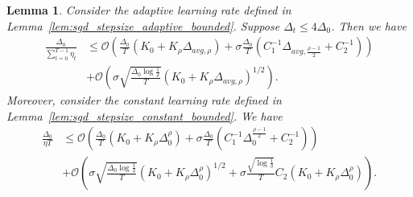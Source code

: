 \documentclass{article}
\newtheorem{lemma}{Lemma}
\newcommand{\Kr}{K_{\rho}}
\newcommand{\paren}[1]{\left( #1 \right)}
\begin{document}
\begin{lemma}\label{lem:sgd_stepsize_complexity_bounded}
    Consider the adaptive learning rate defined in Lemma~\ref{lem:sgd_stepsize_adaptive_bounded}. Suppose $\Delta_t\leq4\Delta_0$.
    Then  we have 
    \begin{align*}
       \frac{\Delta_0}{\sum_{t=0}^{T-1}\eta_t}&\leq \mathcal{O}\left(\frac{\Delta_0}{T}\paren{K_0+\Kr\Delta_{avg,\rho}}+\sigma\frac{\Delta_0}{T}\paren{C_1^{-1}\Delta_{avg,\frac{\rho-1}{2}}+C_2^{-1}}\right)\\
        &+ \mathcal{O}\paren{\sigma\sqrt{\frac{\Delta_0\log\frac{1}{\delta}}{T}}\paren{K_0+\Kr\Delta_{avg,\rho}}^{1/2}}.
    \end{align*}
    Moreover, consider the constant learning rate defined in Lemma~\ref{lem:sgd_stepsize_constant_bounded}. We have 
    \begin{align*}
        \frac{\Delta_0}{\eta T}&\leq \mathcal{O}\left(\frac{\Delta_0}{T}\paren{K_0+\Kr\Delta_{0}^\rho}+\sigma\frac{\Delta_0}{T}\paren{C_1^{-1}\Delta_{0}^{\frac{\rho-1}{2}}+C_2^{-1}}\right)\\
        &+ \mathcal{O}\paren{\sigma\sqrt{\frac{\Delta_0\log\frac{1}{\delta}}{T}}\paren{K_0+\Kr\Delta_{0}^{\rho}}^{1/2}+\sigma\frac{\sqrt{\log\frac{1}{\delta}}}{T}C_2\paren{K_0+\Kr\Delta_0^\rho}}.
    \end{align*}
\end{lemma}
\end{document}
